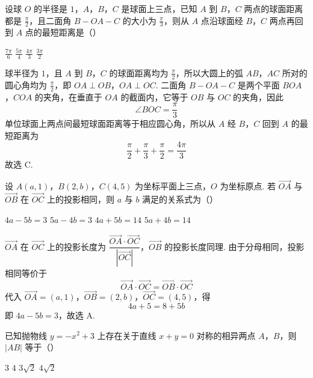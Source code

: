 \begin{problem}
设球 \(O\) 的半径是 \(1\)，\(A\)，\(B\)，\(C\) 是球面上三点，已知 \(A\) 到 \(B\)，\(C\) 两点的球面距离都是 \(\frac{\pi}{2}\)，且二面角 \(B - OA - C\) 的大小为 \(\frac{\pi}{3}\)，则从 \(A\) 点沿球面经 \(B\)，\(C\) 两点再回到 \(A\) 点的最短距离是（\quad）


\choices
    {\(\frac{7\pi}{6}\)}
    {\(\frac{5\pi}{4}\)}
    {\(\frac{4\pi}{3}\)}
    {\(\frac{3\pi}{2}\)}
\end{problem}


\begin{solution}
球半径为 \(1\)，且 \(A\) 到 \(B\)，\(C\) 的球面距离均为 \(\frac\pi2\)，所以大圆上的弧 \(AB\)，\(AC\) 所对的圆心角均为 \(\frac\pi2\)，即 \(OA\perp OB\)，\(OA\perp OC\). 二面角 \(B-OA-C\) 是两个平面 \(BOA\)，\(COA\) 的夹角，在垂直于 \(OA\) 的截面内，它等于 \(OB\) 与 \(OC\) 的夹角，因此
\[
\angle BOC=\frac\pi3
\]
单位球面上两点间最短球面距离等于相应圆心角，所以从 \(A\) 经 \(B\)，\(C\) 回到 \(A\) 的最短距离为
\[
\frac\pi2+\frac\pi3+\frac\pi2=\frac{4\pi}{3}
\]
故选 C.
\end{solution}

\begin{problem}
设 \(A(a,1)\)，\(B(2,b)\)，\(C(4,5)\) 为坐标平面上三点，\(O\) 为坐标原点. 若 \(\overrightarrow{OA}\) 与 \(\overrightarrow{OB}\) 在 \(\overrightarrow{OC}\) 上的投影相同，则 \(a\) 与 \(b\) 满足的关系式为（\quad）

\choices
    {\(4a - 5b = 3\)}
    {\(5a - 4b = 3\)}
    {\(4a + 5b = 14\)}
    {\(5a + 4b = 14\)}
\end{problem}


\begin{solution}
\(\overrightarrow{OA}\) 在 \(\overrightarrow{OC}\) 上的投影长度为 \(\dfrac{\overrightarrow{OA}\cdot\overrightarrow{OC}}{|\overrightarrow{OC}|}\)，\(\overrightarrow{OB}\) 的投影长度同理. 由于分母相同，投影相同等价于
\[
\overrightarrow{OA}\cdot\overrightarrow{OC}=\overrightarrow{OB}\cdot\overrightarrow{OC}
\]
代入 \(\overrightarrow{OA}=(a,1)\)，\(\overrightarrow{OB}=(2,b)\)，\(\overrightarrow{OC}=(4,5)\)，得
\[
4a+5=8+5b
\]
即 \(4a-5b=3\)，故选 A.
\end{solution}

\begin{problem}
已知抛物线 \( y = -x^2 + 3 \) 上存在关于直线 \( x + y = 0 \) 对称的相异两点 \(A\)，\(B\)，则 \(|AB|\) 等于（\quad）

\choices
    {\(3\)}
    {\(4\)}
    {\(3\sqrt{2}\)}
    {\(4\sqrt{2}\)}
\end{problem}

